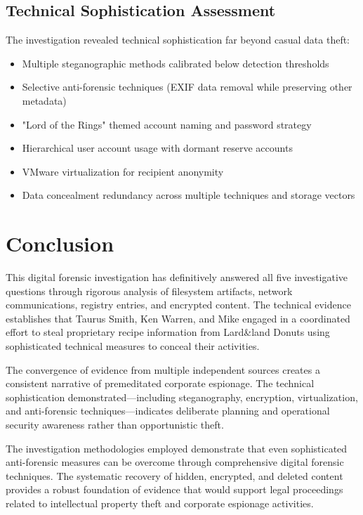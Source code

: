 \subsection{Technical Sophistication Assessment}
The investigation revealed technical sophistication far beyond casual data theft:
\begin{itemize}
    \item Multiple steganographic methods calibrated below detection thresholds
    \item Selective anti-forensic techniques (EXIF data removal while preserving other metadata)
    \item "Lord of the Rings" themed account naming and password strategy
    \item Hierarchical user account usage with dormant reserve accounts
    \item VMware virtualization for recipient anonymity
    \item Data concealment redundancy across multiple techniques and storage vectors
\end{itemize}

\section{Conclusion}
This digital forensic investigation has definitively answered all five investigative questions through rigorous analysis of filesystem artifacts, network communications, registry entries, and encrypted content. The technical evidence establishes that Taurus Smith, Ken Warren, and Mike engaged in a coordinated effort to steal proprietary recipe information from Lard\&land Donuts using sophisticated technical measures to conceal their activities.

The convergence of evidence from multiple independent sources creates a consistent narrative of premeditated corporate espionage. The technical sophistication demonstrated—including steganography, encryption, virtualization, and anti-forensic techniques—indicates deliberate planning and operational security awareness rather than opportunistic theft.

The investigation methodologies employed demonstrate that even sophisticated anti-forensic measures can be overcome through comprehensive digital forensic techniques. The systematic recovery of hidden, encrypted, and deleted content provides a robust foundation of evidence that would support legal proceedings related to intellectual property theft and corporate espionage activities.